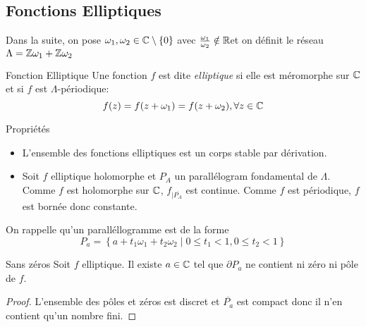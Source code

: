 \documentclass{cours}
\begin{document}
\subsection{Fonctions Elliptiques}

Dans la suite, on pose $\omega_{1}, \omega_{2} \in \mathbb{C}\setminus \{0\}$ avec $\frac{\omega_{1}}{\omega_{2}} \notin \mathbb{R}$et on définit le réseau $\Lambda = \mathbb{Z}\omega_{1} + \mathbb{Z}\omega_{2}$

\begin{définition}
	{Fonction Elliptique}{}
	Une fonction $f$ est dite \emph{elliptique} si elle est méromorphe sur $\mathbb{C}$ et si $f$ est $\Lambda$-périodique: 
	\begin{equation*}
		f(z) = f(z + \omega_{1}) = f(z + \omega_{2}), \forall z \in \mathbb{C}
	\end{equation*}
\end{définition}

\begin{propositionfr}
	{Propriétés}{}
	\begin{itemize}
		\item L'ensemble des fonctions elliptiques est un corps stable par dérivation. 
		\item Soit $f$ elliptique holomorphe et $P_{A}$ un parallélogram fondamental de $\Lambda$. Comme $f$ est holomorphe sur $\mathbb{C}$, $f_{\mid\overline{P_{A}}}$ est continue. Comme $f$ est périodique, $f$ est bornée donc constante. 
	\end{itemize}
\end{propositionfr}

On rappelle qu'un paralléllogramme est de la forme 
\begin{equation*}
	P_{a} = \left\{a + t_{1}\omega_{1} + t_{2}\omega_{2}\middle| 0 \leq t_{1} < 1, 0 \leq t_{2} < 1\right\}
\end{equation*}

\begin{lemme}
	{Sans zéros}{}
	Soit $f$ elliptique. Il existe $a \in \mathbb{C}$ tel que $\partial P_{a}$ ne contient ni zéro ni pôle de $f$. 
\end{lemme}
\begin{proof}
	L'ensemble des pôles et zéros est discret et $\overline{P_{a}}$ est compact donc il n'en contient qu'un nombre fini. 
\end{proof}
\end{document}
